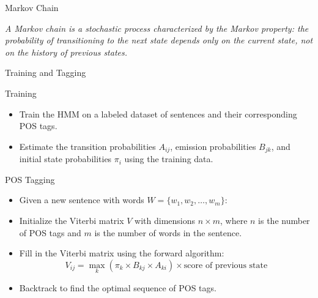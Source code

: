 \begin{frame}{Markov Chain}
    \begin{definition}
        \textit{A Markov chain is a stochastic process characterized by the Markov property: the probability of transitioning to the next state depends only on the current state, not on the history of previous states.}
    \end{definition}
\end{frame}

\begin{frame}{Training and Tagging}
    \begin{block}{Training}
\begin{itemize}
    \item Train the HMM on a labeled dataset of sentences and their corresponding POS tags.
    \item Estimate the transition probabilities $A_{ij}$, emission probabilities $B_{jk}$, and initial state probabilities $\pi_i$ using the training data.
\end{itemize}
    \end{block}
\begin{block}{POS Tagging}
    \begin{itemize}
        \item Given a new sentence with words $W = \{w_1, w_2, \ldots, w_m\}$:
        \item Initialize the Viterbi matrix $V$ with dimensions $n \times m$, where $n$ is the number of POS tags and $m$ is the number of words in the sentence.
        \item Fill in the Viterbi matrix using the forward algorithm:
        \[
        V_{ij} = \max_{k} \left(\pi_k \times B_{kj} \times A_{ki}\right) \times \text{{score of previous state}}
        \]
        \item Backtrack to find the optimal sequence of POS tags.
    \end{itemize}
\end{block}
\end{frame}

